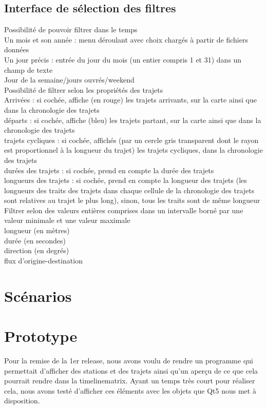 \documentclass[12pt]{article}
\begin{document}
		\subsection{Interface de sélection des filtres}
		Possibilité de pouvoir filtrer dans le temps\\
		Un mois et son année : menu déroulant avec choix chargés à partir de fichiers
		données\\
		Un jour précis : entrée du jour du mois (un entier compris 1 et 31) dans un champ
		de texte\\
		Jour de la semaine/jours ouvrés/weekend\\
		Possibilité de filtrer selon les propriétés des trajets\\
		Arrivées : si cochée, affiche (en rouge) les trajets arrivants, sur la carte ainsi
		que dans la chronologie des trajets\\
		départs : si cochée, affiche (bleu) les trajets partant, sur la carte ainsi que
		dans la chronologie des trajets\\
		trajets cycliques : si cochée, affichés (par un cercle gris transparent dont le
		rayon est proportionnel à la longueur du trajet) les trajets cycliques, dans la
		chronologie des trajets\\
		durées des trajets : si cochée, prend en compte la durée des trajets\\
		longueurs des trajets : si cochée, prend en compte la longueur des trajets
		(les longueurs des traits des trajets dans chaque cellule de la chronologie des
		trajets sont relatives au trajet le plus long), sinon, tous les traits sont de même longueur\\
		Filtrer selon des valeurs entières comprises dans un intervalle borné par une
		valeur minimale et une valeur maximale\\
		longueur (en mètres)\\
		durée (en secondes)\\
		direction (en degrés)\\
		flux d’origine-destination\\		
	
	\section{Scénarios}
	
	\section{Prototype}
	Pour la remise de la 1er release, nous avons voulu de rendre un programme qui permettait
	d'afficher des stations et des trajets ainsi qu'un aperçu de ce que cela pourrait rendre
	dans la timelinematrix. Ayant un temps très court pour réaliser cela, nous avons testé
	d'afficher ces éléments avec les objets que Qt5 nous met à disposition.\\
	
\end{document}

